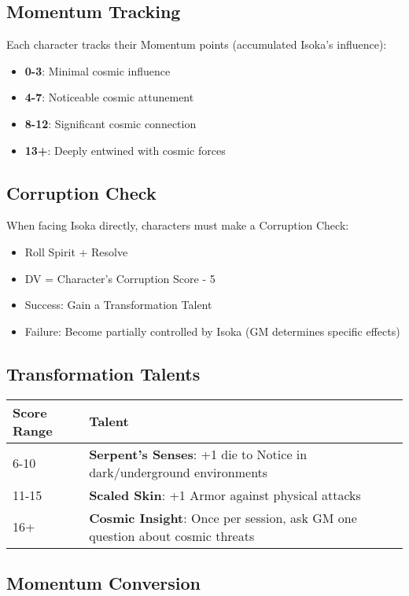 \documentclass[11pt]{article}
\begin{document}
\subsection{Momentum Tracking}

Each character tracks their Momentum points (accumulated Isoka's influence):
\begin{itemize}[leftmargin=*]
    \item \textbf{0-3}: Minimal cosmic influence
    \item \textbf{4-7}: Noticeable cosmic attunement
    \item \textbf{8-12}: Significant cosmic connection
    \item \textbf{13+}: Deeply entwined with cosmic forces
\end{itemize}

\subsection{Corruption Check}

When facing Isoka directly, characters must make a Corruption Check:
\begin{itemize}[leftmargin=*]
    \item Roll Spirit + Resolve
    \item DV = Character's Corruption Score - 5
    \item Success: Gain a Transformation Talent
    \item Failure: Become partially controlled by Isoka (GM determines specific effects)
\end{itemize}

\subsection{Transformation Talents}

\begin{tabular}{|p{4cm}|p{8cm}|}
\hline
\textbf{Score Range} & \textbf{Talent} \\
\hline
6-10 & \textbf{Serpent's Senses}: +1 die to Notice in dark/underground environments \\
\hline
11-15 & \textbf{Scaled Skin}: +1 Armor against physical attacks \\
\hline
16+ & \textbf{Cosmic Insight}: Once per session, ask GM one question about cosmic threats \\
\hline
\end{tabular}

\subsection{Momentum Conversion}
\end{document}
